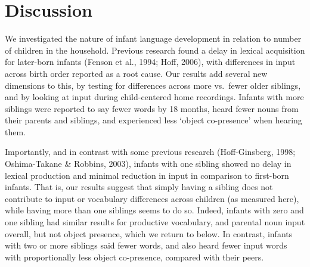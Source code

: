 \documentclass[
  man,floatsintext]{apa6}
\begin{document}
\hypertarget{discussion}{%
\section{Discussion}\label{discussion}}

We investigated the nature of infant language development in relation to number of children in the household. Previous research found a delay in lexical acquisition for later-born infants (Fenson et al., 1994; Hoff, 2006), with differences in input across birth order reported as a root cause. Our results add several new dimensions to this, by testing for differences across more vs.~fewer older siblings, and by looking at input during child-centered home recordings. Infants with more siblings were reported to say fewer words by 18 months, heard fewer nouns from their parents and siblings, and experienced less `object co-presence' when hearing them.

Importantly, and in contrast with some previous research (Hoff-Ginsberg, 1998; Oshima-Takane \& Robbins, 2003), infants with one sibling showed no delay in lexical production and minimal reduction in input in comparison to first-born infants. That is, our results suggest that simply having a sibling does not contribute to input or vocabulary differences across children (as measured here), while having more than one siblings seems to do so. Indeed, infants with zero and one sibling had similar results for productive vocabulary, and parental noun input overall, but not object presence, which we return to below. In contrast, infants with two or more siblings said fewer words, and also heard fewer input words with proportionally less object co-presence, compared with their peers.
\end{document}
